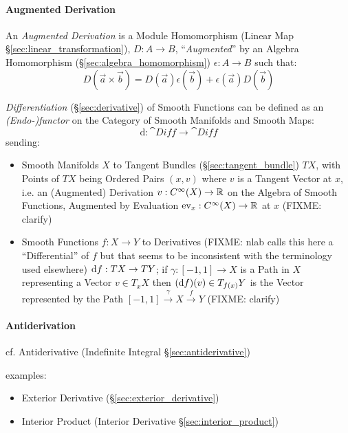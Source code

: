 \paragraph{Augmented Derivation}\label{sec:augmented_derivation}\hfill

An \emph{Augmented Derivation} is a Module Homomorphism (Linear Map
\S\ref{sec:linear_transformation}), $D : A \rightarrow B$, ``\emph{Augmented}''
by an Algebra Homomorphism (\S\ref{sec:algebra_homomorphism})
$\epsilon : A \rightarrow B$ such that:
\[
  D(\vec{a} \times \vec{b}) =
  D(\vec{a})\epsilon(\vec{b}) + \epsilon(\vec{a})D(\vec{b})
\]

\fist \emph{Differentiation} (\S\ref{sec:derivative}) of Smooth Functions can be
defined as an \emph{(Endo-)functor} on the Category of Smooth Manifolds and
Smooth Maps:
\[
  \mathrm{d} : \cat{Diff} \rightarrow \cat{Diff}
\]
sending:
\begin{itemize}
  \item Smooth Manifolds $X$ to Tangent Bundles (\S\ref{sec:tangent_bundle}) $T
    X$, with Points of $T X$ being Ordered Pairs $(x, v)$ where $v$ is a Tangent
    Vector at $x$, i.e. an (Augmented) Derivation $v : C^\infty(X) \rightarrow
    \mathbb{R}$ on the Algebra of Smooth Functions, Augmented by Evaluation
    $\mathrm{ev}_x : C^\infty(X) \rightarrow \mathbb{R}$ at $x$ (FIXME: clarify)
  \item Smooth Functions $f : X \rightarrow Y$ to Derivatives (FIXME: nlab calls
    this here a ``Differential'' of $f$ but that seems to be inconsistent with
    the terminology used elsewhere) $\mathrm{d}f : TX \rightarrow TY$; if $\gamma
    : [-1,1] \rightarrow X$ is a Path in $X$ representing a Vector
    $v \in T_x{X}$ then $(\mathrm{d}f)(v) \in T_{f(x)}Y$ is the Vector represented
    by the Path $[-1, 1] \xrightarrow{\gamma} X \xrightarrow{f} Y$
    (FIXME: clarify)
\end{itemize}



\paragraph{Antiderivation}\label{sec:antiderivation}\hfill

cf. Antiderivative (Indefinite Integral \S\ref{sec:antiderivative})

examples:
\begin{itemize}
  \item Exterior Derivative (\S\ref{sec:exterior_derivative})
  \item Interior Product (Interior Derivative \S\ref{sec:interior_product})
\end{itemize}



